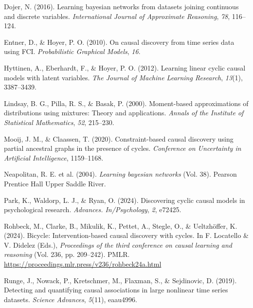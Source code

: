 \documentclass[
]{article}
\newlength{\cslhangindent}
\newenvironment{CSLReferences}[2] %
 {\begin{list}{}{%
  \setlength{\itemindent}{0pt}
  \setlength{\leftmargin}{0pt}
  \setlength{\parsep}{0pt}
  \ifodd #1
   \setlength{\leftmargin}{\cslhangindent}
   \setlength{\itemindent}{-1\cslhangindent}
  \fi
  \setlength{\itemsep}{#2\baselineskip}}}
 {\end{list}}
\begin{document}
\label{refs}
\begin{CSLReferences}{1}{0}
Dojer, N. (2016). Learning bayesian networks from datasets joining
continuous and discrete variables. \emph{International Journal of
Approximate Reasoning}, \emph{78}, 116--124.

Entner, D., \& Hoyer, P. O. (2010). On causal discovery from time series
data using FCI. \emph{Probabilistic Graphical Models}, \emph{16}.

Hyttinen, A., Eberhardt, F., \& Hoyer, P. O. (2012). Learning linear
cyclic causal models with latent variables. \emph{The Journal of Machine
Learning Research}, \emph{13}(1), 3387--3439.

Lindsay, B. G., Pilla, R. S., \& Basak, P. (2000). Moment-based
approximations of distributions using mixtures: Theory and applications.
\emph{Annals of the Institute of Statistical Mathematics}, \emph{52},
215--230.

Mooij, J. M., \& Claassen, T. (2020). Constraint-based causal discovery
using partial ancestral graphs in the presence of cycles.
\emph{Conference on Uncertainty in Artificial Intelligence}, 1159--1168.

Neapolitan, R. E. et al. (2004). \emph{Learning bayesian networks} (Vol.
38). Pearson Prentice Hall Upper Saddle River.

Park, K., Waldorp, L. J., \& Ryan, O. (2024). Discovering cyclic causal
models in psychological research. \emph{Advances. In/Psychology},
\emph{2}, e72425.

Rohbeck, M., Clarke, B., Mikulik, K., Pettet, A., Stegle, O., \&
Ueltzhöffer, K. (2024). Bicycle: Intervention-based causal discovery
with cycles. In F. Locatello \& V. Didelez (Eds.), \emph{Proceedings of
the third conference on causal learning and reasoning} (Vol. 236, pp.
209--242). PMLR.
\url{https://proceedings.mlr.press/v236/rohbeck24a.html}

Runge, J., Nowack, P., Kretschmer, M., Flaxman, S., \& Sejdinovic, D.
(2019). Detecting and quantifying causal associations in large nonlinear
time series datasets. \emph{Science Advances}, \emph{5}(11), eaau4996.


\end{CSLReferences}
\end{document}
